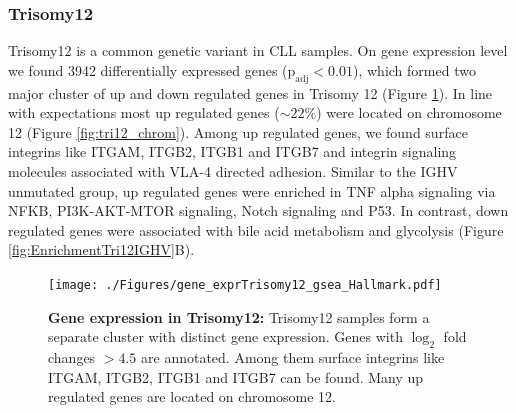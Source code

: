 \subsubsection{Trisomy12} 
Trisomy12 is a common genetic variant in CLL samples. On gene expression level we found 3942 differentially expressed genes ($\text{p}_\text{adj} < 0.01$), which formed two major cluster of up and down regulated genes in Trisomy 12 (Figure \ref{fig:gene_exprTriisomy12_gsea_hallmark}). In line with expectations most up regulated genes ($\sim22\%$) were located on chromosome 12 (Figure \ref{fig:tri12_chrom}). Among up regulated genes, we found surface integrins like ITGAM, ITGB2, ITGB1 and ITGB7 and integrin signaling molecules associated with VLA-4 directed adhesion. Similar to the IGHV unmutated group, up regulated genes were enriched in TNF alpha signaling via NFKB, PI3K-AKT-MTOR signaling, Notch signaling and P53. In contrast, down regulated genes were associated with bile acid metabolism and glycolysis (Figure \ref{fig:EnrichmentTri12IGHV}B). 

\FloatBarrier

\begin{figure}
	\centering
	\texttt{[image: ./Figures/gene\_exprTrisomy12\_gsea\_Hallmark.pdf]}
	\caption{\textbf{Gene expression in Trisomy12:} Trisomy12 samples form a separate cluster with distinct gene expression. Genes with $\log_2$ fold changes $>4.5$ are annotated. Among them surface integrins like ITGAM, ITGB2, ITGB1 and ITGB7 can be found. Many up regulated genes are located on chromosome 12.}
	\label{fig:gene_exprTriisomy12_gsea_hallmark}
\end{figure}


